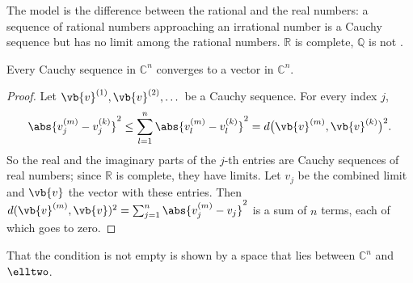 \begin{fundament}[id=c03.f3,
    titel={Completeness},
    wozu={The core says that a vector space with an inner product lacks one more condition to
      be a Hilbert space and that it always holds in $\mathbb{C}^n$. Here is what the
      condition demands, why $\mathbb{C}^n$, $\elltwo$ and $\Ltwo{\mathbb{R}}$ satisfy it, and
      a space that violates it.},
    voraussetzung={Blocks~\ref{c03.v1} and~\ref{c03.v2}, Foundations~\ref{c03.f2}; sequences
      and limits.},
    zurueck={$\mathbb{C}^n$, $\elltwo$ and $\Ltwo{\mathbb{R}}$ are complete. Whoever computes
      with them need not think about the condition.}]

  The model is the difference between the rational and the real numbers: a sequence of
  rational numbers approaching an irrational number is a Cauchy sequence but has no limit
  among the rational numbers. $\mathbb{R}$ is complete, $\mathbb{Q}$ is not
  .

  \begin{proposition}\label{c03.prop.cn-vollstaendig}
    Every Cauchy sequence in $\mathbb{C}^n$ converges to a vector in $\mathbb{C}^n$.
  \end{proposition}
  \begin{proof}
    Let $\vb{v}^{(1)}, \vb{v}^{(2)}, \dots$ be a Cauchy sequence. For every index $j$,
    \begin{equation}\label{c03.eq.komponente}
      \abs{v_j^{(m)} - v_j^{(k)}}^2
      \leq \sum_{l=1}^{n} \abs{v_l^{(m)} - v_l^{(k)}}^2
      = d\bigl(\vb{v}^{(m)}, \vb{v}^{(k)}\bigr)^2 .
    \end{equation}
    So the real and the imaginary parts of the $j$-th entries are Cauchy sequences of real
    numbers; since $\mathbb{R}$ is complete, they have limits. Let $v_j$ be the combined limit
    and $\vb{v}$ the vector with these entries. Then
    $d(\vb{v}^{(m)}, \vb{v})^2 = \sum_{j=1}^{n} \abs{v_j^{(m)} - v_j}^2$ is a sum of $n$ terms,
    each of which goes to zero.
  \end{proof}

  That the condition is not empty is shown by a space that lies between $\mathbb{C}^n$ and
  $\elltwo$.


\end{fundament}
